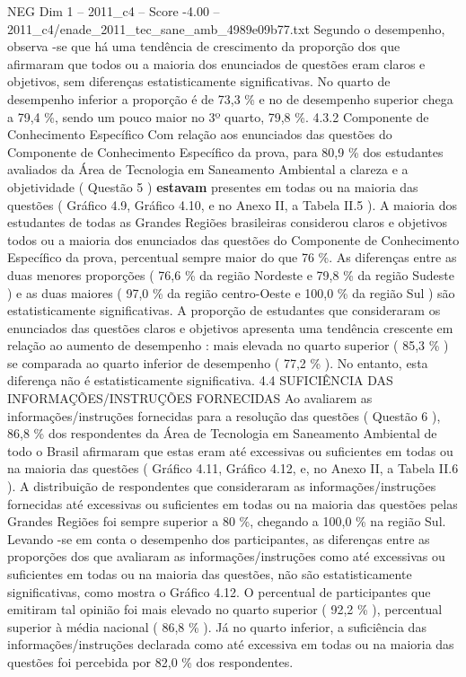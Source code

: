 \begin{textsample}{NEG Dim 1 – 2011\_c4 – Score -4.00 – 2011\_c4/enade\_2011\_tec\_sane\_amb\_4989e09b77.txt}
Segundo o desempenho, observa -se que há uma tendência de crescimento da proporção dos que afirmaram que todos ou a maioria dos enunciados de questões eram claros e objetivos, sem diferenças estatisticamente significativas.
No quarto de desempenho inferior a proporção é de 73,3 \% e no de desempenho superior chega a 79,4 \%, sendo um pouco maior no 3º quarto, 79,8 \%. 4.3.2 Componente de Conhecimento Específico Com relação aos enunciados das questões do Componente de Conhecimento Específico da prova, para 80,9 \% dos estudantes avaliados da Área de Tecnologia em Saneamento Ambiental a clareza e a objetividade ( Questão 5 ) \textbf{estavam} presentes em todas ou na maioria das questões ( Gráfico 4.9, Gráfico 4.10, e no Anexo II, a Tabela II.5 ).
A maioria dos estudantes de todas as Grandes Regiões brasileiras considerou claros e objetivos todos ou a maioria dos enunciados das questões do Componente de Conhecimento Específico da prova, percentual sempre maior do que 76 \%.
As diferenças entre as duas menores proporções ( 76,6 \% da região Nordeste e 79,8 \% da região Sudeste ) e as duas maiores ( 97,0 \% da região centro-Oeste e 100,0 \% da região Sul ) são estatisticamente significativas.
A proporção de estudantes que consideraram os enunciados das questões claros e objetivos apresenta uma tendência crescente em relação ao aumento de desempenho : mais elevada no quarto superior ( 85,3 \% ) se comparada ao quarto inferior de desempenho ( 77,2 \% ).
No entanto, esta diferença não é estatisticamente significativa. 4.4 SUFICIÊNCIA DAS INFORMAÇÕES/INSTRUÇÕES FORNECIDAS Ao avaliarem as informações/instruções fornecidas para a resolução das questões ( Questão 6 ), 86,8 \% dos respondentes da Área de Tecnologia em Saneamento Ambiental de todo o Brasil afirmaram que estas eram até excessivas ou suficientes em todas ou na maioria das questões ( Gráfico 4.11, Gráfico 4.12, e, no Anexo II, a Tabela II.6 ).
A distribuição de respondentes que consideraram as informações/instruções fornecidas até excessivas ou suficientes em todas ou na maioria das questões pelas Grandes Regiões foi sempre superior a 80 \%, chegando a 100,0 \% na região Sul.
Levando -se em conta o desempenho dos participantes, as diferenças entre as proporções dos que avaliaram as informações/instruções como até excessivas ou suficientes em todas ou na maioria das questões, não são estatisticamente significativas, como mostra o Gráfico 4.12.
O percentual de participantes que emitiram tal opinião foi mais elevado no quarto superior ( 92,2 \% ), percentual superior à média nacional ( 86,8 \% ).
Já no quarto inferior, a suficiência das informações/instruções declarada como até excessiva em todas ou na maioria das questões foi percebida por 82,0 \% dos respondentes.

\end{textsample}
